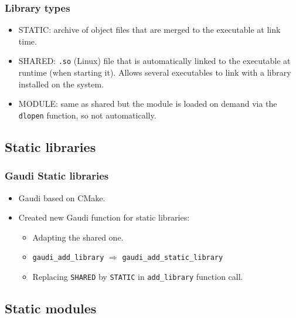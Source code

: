 \documentclass{beamer}
\begin{document}
\begin{frame}[fragile]
    \frametitle{Library types}

    \begin{itemize}
        \item STATIC: archive of object files that are merged to the executable at link time.
        \item SHARED: \verb'.so' (Linux) file that is automatically linked to the executable at runtime (when starting it).
              Allows several executables to link with a library installed on the system.
        \item MODULE: same as shared but the module is loaded on demand via the \verb'dlopen' function, so not automatically.
    \end{itemize}
\end{frame}

\subsection{Static libraries}

\begin{frame}[fragile]
    \frametitle{Gaudi Static libraries}

    \begin{itemize}
        \item Gaudi based on CMake.
        \item Created new Gaudi function for static libraries:
              \begin{itemize}
                  \item Adapting the shared one.
                  \item \verb'gaudi_add_library' $\Rightarrow$ \verb'gaudi_add_static_library'
                  \item Replacing \verb'SHARED' by \verb'STATIC' in \verb'add_library' function call.
              \end{itemize}
    \end{itemize}
\end{frame}

\subsection{Static modules}
\end{document}
